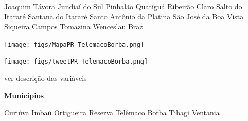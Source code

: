 \documentclass[10pt]{article} %
\begin{document}
\begin{minipage}[t]{.30\linewidth}
\begin{mdframed}[style=sidebar,frametitle={}]
\begin{itemize}
\gsquare Joaquim Távora 
\gsquare Jundiaí do Sul 
\gsquare Pinhalão 
\gsquare Quatiguá 
\gsquare Ribeirão Claro 
\gsquare Salto do Itararé 
\gsquare Santana do Itararé 
\gsquare Santo Antônio da Platina 
\gsquare São José da Boa Vista 
\gsquare Siqueira Campos 
\gsquare Tomazina 
\gsquare Wenceslau Braz 
\end{itemize}\BackToContents\end{mdframed}\hfill\end{minipage}\newpage\begin{minipage}[t]{.66\linewidth}
\hypertarget{TlmB}{}
\texttt{[image: figs/MapaPR\_TelemacoBorba.png]}\vspace{0.5cm}\vspace{0.5cm}\begin{center}
\texttt{[image: figs/tweetPR\_TelemacoBorba.png]}\end{center}
\begin{center}

\end{center}
\small{\hyperlink{vartab}{ver descrição das variáveis}}\end{minipage}\hfill\begin{minipage}[t]{.30\linewidth}
\begin{mdframed}[style=sidebar,frametitle={}]
\textbf{\hyperlink{municips}{Municipios}}\begin{itemize}\gsquare Curiúva 
\gsquare Imbaú 
\gsquare Ortigueira 
\gsquare Reserva 
\gsquare Telêmaco Borba 
\gsquare Tibagi 
\gsquare Ventania 
\end{itemize}\BackToContents\end{mdframed}\hfill\end{minipage}\newpage


 
      \hypertarget{municips}{}

      
     \begin{center}
            
     \end{center}
\end{document}

